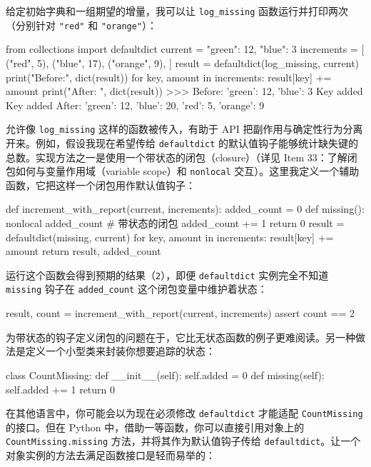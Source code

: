 给定初始字典和一组期望的增量，我可以让 \texttt{log\_missing} 函数运行并打印两次（分别针对 \texttt{"red"} 和 \texttt{"orange"}）：

\begin{codebox}[python]
from collections import defaultdict
current = {"green": 12, "blue": 3}
increments = [
    ("red", 5),
    ("blue", 17),
    ("orange", 9),
]
result = defaultdict(log_missing, current)
print("Before:", dict(result))
for key, amount in increments:
    result[key] += amount
print("After: ", dict(result))
>>>
Before: {'green': 12, 'blue': 3}
Key added
Key added
After:  {'green': 12, 'blue': 20, 'red': 5, 'orange': 9}
\end{codebox}

允许像 \texttt{log\_missing} 这样的函数被传入，有助于 API 把副作用与确定性行为分离开来。例如，假设我现在希望传给 \texttt{defaultdict} 的默认值钩子能够统计缺失键的总数。实现方法之一是使用一个带状态的闭包（closure）（详见 Item 33：了解闭包如何与变量作用域（variable scope）和 \texttt{nonlocal} 交互）。这里我定义一个辅助函数，它把这样一个闭包用作默认值钩子：

\begin{codebox}[python]
def increment_with_report(current, increments):
    added_count = 0
    def missing():
        nonlocal added_count  # 带状态的闭包
        added_count += 1
        return 0
    result = defaultdict(missing, current)
    for key, amount in increments:
        result[key] += amount
    return result, added_count
\end{codebox}

运行这个函数会得到预期的结果（\texttt{2}），即便 \texttt{defaultdict} 实例完全不知道 \texttt{missing} 钩子在 \texttt{added\_count} 这个闭包变量中维护着状态：

\begin{codebox}[python]
result, count = increment_with_report(current, increments)
assert count == 2
\end{codebox}

为带状态的钩子定义闭包的问题在于，它比无状态函数的例子更难阅读。另一种做法是定义一个小型类来封装你想要追踪的状态：

\begin{codebox}[python]
class CountMissing:
    def __init__(self):
        self.added = 0
    def missing(self):
        self.added += 1
        return 0
\end{codebox}

在其他语言中，你可能会以为现在必须修改 \texttt{defaultdict} 才能适配 \texttt{CountMissing} 的接口。但在 Python 中，借助一等函数，你可以直接引用对象上的 \texttt{CountMissing.missing} 方法，并将其作为默认值钩子传给 \texttt{defaultdict}。让一个对象实例的方法去满足函数接口是轻而易举的：

